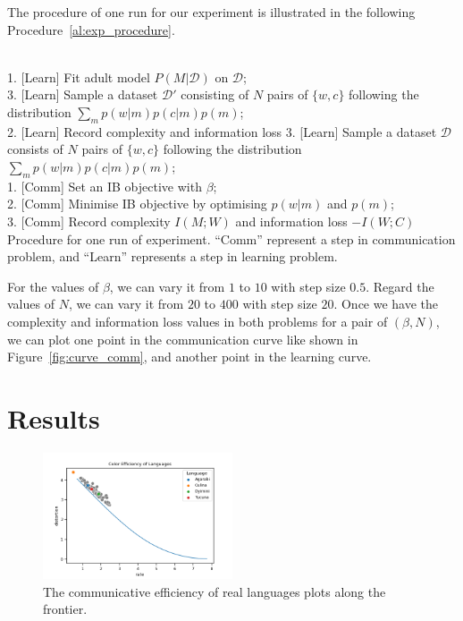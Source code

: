 \documentclass[11pt]{article}
\begin{document}
The procedure of one run for our experiment is illustrated in the following Procedure~\ref{al:exp_procedure}.

\begin{algorithm}[h]
    \SetAlgoLined
     \\
    1. [Learn] Fit adult model $P(M|\mathcal{D})$ on $\mathcal{D}$; \\
    3. [Learn] Sample a dataset $\mathcal{D'}$ consisting of $N$ pairs of $\{w,c\}$ following the distribution $\sum_m p(w|m)p(c|m)p(m)$; \\
    2. [Learn] Record complexity and information loss
    3. [Learn] Sample a dataset $\mathcal{D}$ consists of $N$ pairs of $\{w,c\}$ following the distribution $\sum_m p(w|m)p(c|m)p(m)$; \\
    1. [Comm] Set an IB objective with $\beta$; \\
    2. [Comm] Minimise IB objective by optimising $p(w|m)$ and $p(m)$; \\
    3. [Comm] Record complexity $I(M;W)$ and information loss $-I(W;C)$ \\
 \caption{Procedure for one run of experiment. ``Comm'' represent a step in communication problem, and ``Learn'' represents a step in learning problem.}
 \label{al:exp_procedure}
\end{algorithm}

For the values of $\beta$, we can vary it from $1$ to $10$ with step size $0.5$. 
Regard the values of $N$, we can vary it from $20$ to $400$ with step size $20$.
Once we have the complexity and information loss values in both problems for a pair of $(\beta, N)$, we can plot one point in the communication curve like shown in Figure~\ref{fig:curve_comm}, and another point in the learning curve.

\section{Results}
\label{sec:results}

\begin{figure}[h]
    \centering
    \includegraphics[width=0.5\textwidth]{docs/final_report_for_course/graphs/color_efficiency.png}
    \caption{The communicative efficiency of real languages plots along the frontier.}
    \label{fig:communicative_efficiency}
\end{figure}
\end{document}
